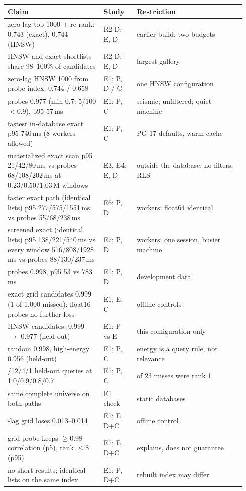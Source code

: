 \documentclass[sigconf]{acmart}
\begin{document}
\small
\begin{longtable}{@{}>{\raggedright\arraybackslash}p{0.38\linewidth}p{0.13\linewidth}>{\raggedright\arraybackslash}p{0.43\linewidth}@{}}
\toprule
Claim & Study & Restriction \\
\midrule\endhead
zero-lag top 1000 + re-rank: 0.743 (exact), 0.744 (HNSW) & R2-D; E, D & earlier build; two budgets \\
HNSW and exact shortlists share 98--100\% of candidates & R2-D; E, D & largest gallery \\
zero-lag HNSW 1000 from probe index: 0.744 / 0.658 & E1; P, D / C & one HNSW configuration \\
probes 0.977 (min 0.7; 5/100 $<$0.9), p95 57\,ms & E1; P, C & seismic; unfiltered; quiet machine \\
fastest in-database exact p95 740\,ms (8 workers allowed) & E1; P, C & PG 17 defaults, warm cache \\
materialized exact scan p95 21/42/80\,ms vs probes 68/108/202\,ms at 0.23/0.50/1.03\,M windows & E3, E4; E, D & outside the database; no filters, RLS \\
faster exact path (identical lists) p95 277/575/1551\,ms vs probes 55/68/238\,ms & E6; P, D & 8 workers; float64 identical \\
screened exact (identical lists) p95 138/221/540\,ms vs every window 516/808/1928\,ms vs probes 88/130/237\,ms & E7; P, D & 8 workers; one session, busier machine \\
probes 0.998, p95 53 vs 783\,ms & E1; P, D & development data \\
exact grid candidates 0.999 (1 of 1,000 missed); float16 probes no further loss & E1; E, C & offline controls \\
HNSW candidates: 0.999 $\to$ 0.977 (held-out) & E1; P vs E & this configuration only \\
random 0.998, high-energy 0.956 (held-out) & E1; P, C & energy is a query rule, not relevance \\
83/12/4/1 held-out queries at 1.0/0.9/0.8/0.7 & E1; P, C & 3 of 23 misses were rank 1 \\
same complete universe on both paths & E1 check & static databases \\
7-lag grid loses 0.013--0.014 & E1; E, D+C & offline control \\
grid probe keeps $\ge$0.98 correlation (p5), rank $\le$8 (p95) & E1; E, D+C & explains, does not guarantee \\
no short results; identical lists on the same index & E1; P, D+C & rebuilt index may differ \\
\bottomrule
\end{longtable}
\end{document}
